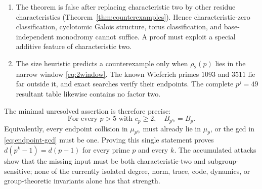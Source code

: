 \documentclass[a4paper]{article}
\begin{document}
\begin{enumerate}
	      is a shortened Zetterberg code, whose general minimum-distance
	      theory stops at weight five, exactly the forbidden weight.
	\item The theorem is false after replacing characteristic two by other
	      residue characteristics (Theorem~\ref{thm:counterexamples}).
	      Hence characteristic-zero classification, cyclotomic Galois
	      structure, torus classification, and base-independent monodromy
	      cannot suffice.  A proof must exploit a special additive feature
	      of characteristic two.
	\item The size heuristic predicts a counterexample only when
	      $\rho_2(p)$ lies in the narrow window \eqref{eq:2window}.
	      The known Wieferich primes
	      $1093$ and $3511$ lie far outside it, and exact searches verify
	      their endpoints.  The complete $p^j=49$ resultant table likewise
	      contains no factor two.
\end{enumerate}

The minimal unresolved assertion is therefore precise:
\[
	\boxed{\text{For every }p>5\text{ with }c_p\geq2,\quad B_{p^{c_p}}=B_p.}
\]
Equivalently, every endpoint collision in $\mu_{p^{c_p}}$ must already lie
in $\mu_p$, or the gcd in \eqref{eq:endpoint-gcd} must be one.  Proving
this single statement proves $d(p^k-1)=d(p-1)$ for every prime $p$ and
every $k$.  The accumulated attacks show that the missing input must be
both characteristic-two and subgroup-sensitive; none of the currently
isolated degree, norm, trace, code, dynamics, or group-theoretic invariants
alone has that strength.



\end{document}
